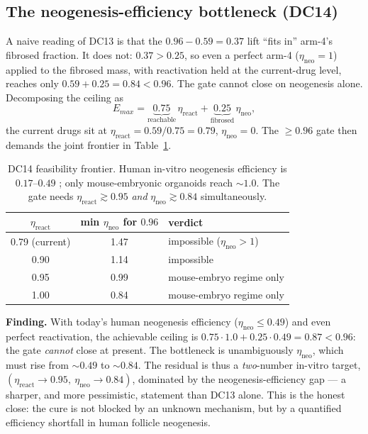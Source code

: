 \documentclass[11pt,a4paper]{article}
\begin{document}
\subsection{The neogenesis-efficiency bottleneck (DC14)}
\label{sec:dc14}

A naive reading of DC13 is that the $0.96-0.59 = 0.37$ lift ``fits in'' arm-4's
fibrosed fraction. It does not: $0.37 > 0.25$, so even a perfect arm-4
($\eta_{\text{neo}}=1$) applied to the fibrosed mass, with reactivation held at
the current-drug level, reaches only $0.59 + 0.25 = 0.84 < 0.96$. The gate cannot
close on neogenesis alone. Decomposing the ceiling as
\begin{equation}
E_{max} = \underbrace{0.75}_{\text{reachable}}\,\eta_{\text{react}}
        + \underbrace{0.25}_{\text{fibrosed}}\,\eta_{\text{neo}},
\end{equation}
the current drugs sit at $\eta_{\text{react}}=0.59/0.75=0.79$, $\eta_{\text{neo}}=0$.
The $\geq 0.96$ gate then demands the joint frontier in Table~\ref{tab:dc14}.

\begin{table}[h]
\centering\small
\begin{tabular}{ccl}
\toprule
$\eta_{\text{react}}$ & min $\eta_{\text{neo}}$ for $0.96$ & verdict \\
\midrule
0.79 (current) & 1.47 & impossible ($\eta_{\text{neo}}>1$) \\
0.90 & 1.14 & impossible \\
0.95 & 0.99 & mouse-embryo regime only \\
1.00 & 0.84 & mouse-embryo regime only \\
\bottomrule
\end{tabular}
\caption{DC14 feasibility frontier. Human in-vitro neogenesis efficiency is
$0.17$--$0.49$ \citep{vitroDrugTest2023}; only mouse-embryonic organoids reach
${\sim}1.0$. The gate needs $\eta_{\text{react}}\gtrsim 0.95$ \emph{and}
$\eta_{\text{neo}}\gtrsim 0.84$ simultaneously.}
\label{tab:dc14}
\end{table}

\noindent\textbf{Finding.} With today's human neogenesis efficiency
($\eta_{\text{neo}}\leq 0.49$) and even perfect reactivation, the achievable
ceiling is $0.75\cdot 1.0 + 0.25\cdot 0.49 = \mathbf{0.87} < 0.96$: the gate
\emph{cannot} close at present. The bottleneck is unambiguously
$\eta_{\text{neo}}$, which must rise from ${\sim}0.49$ to ${\sim}0.84$. The
residual is thus a \emph{two}-number in-vitro target,
$(\eta_{\text{react}}{\to}0.95,\ \eta_{\text{neo}}{\to}0.84)$, dominated by the
neogenesis-efficiency gap --- a sharper, and more pessimistic, statement than DC13
alone. This is the honest close: the cure is not blocked by an unknown mechanism,
but by a quantified efficiency shortfall in human follicle neogenesis.
\end{document}
